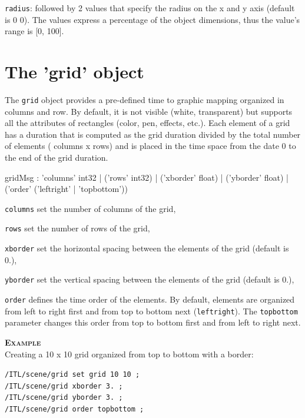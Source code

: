 \documentclass[a4paper,twoside]{report}
\newcommand{\sublevel}[1]	{\section{#1}}
\newcommand{\OSC}[1]		{\texttt{#1}}
\newcommand{\example}		{\textbf{\hspace{-1.5cm}\textbf{\textsc{Example }}}}
\let\olditemize\itemize
\let\oldenditemize\enditemize
\renewenvironment{itemize} 	{\olditemize \setlength{\itemsep}{1mm}}{\oldenditemize}
\newcommand{\sample}	[1]			{\vspace{-2mm}\begin{center}\colorbox{mygrey}{
								\begin{minipage}[t]{0.9\columnwidth} 
								{\small \texttt{#1}}
								\end{minipage}}\end{center}}
\begin{document}
\begin{itemize}
\item \OSC{radius}: followed by 2 values that specify the radius on the x and y axis (default is 0 0). The values express a percentage of the object dimensions, thus the value's range is [0, 100].
\end{itemize} 


\sublevel{The 'grid' object}
\label{grid}

The \OSC{grid} object provides a pre-defined time to graphic mapping organized in columns and row. By default, it is not visible (white, transparent) but supports all the attributes of rectangles (color, pen, effects, etc.). Each element of a grid has a duration that is computed as the grid duration divided by the total number of elements ( columns x rows) and is placed in the time space from the date 0 to the end of the grid duration.

\begin{rail}
gridMsg : 'columns' int32
		| ('rows' int32) 
		| ('xborder' float)
		| ('yborder' float)
		| ('order' ('leftright' | 'topbottom'))
\end{rail}

\begin{itemize}
\item \OSC{columns} set the number of columns of the grid,
\item \OSC{rows} set the number of rows of the grid,
\item \OSC{xborder} set the horizontal spacing between the elements of the grid (default is 0.),
\item \OSC{yborder} set the vertical spacing between the elements of the grid (default is 0.),
\item \OSC{order} defines the time order of the elements. By default, elements are organized from left to right first and from top to bottom next (\OSC{leftright}). The \OSC{topbottom} parameter changes this order from top to bottom first and from left to right next.
\end{itemize}

\example \\
Creating a 10 x 10 grid organized from top to bottom with a border:
\sample{/ITL/scene/grid set grid 10 10 ;\\
/ITL/scene/grid xborder 3. ;\\
/ITL/scene/grid yborder 3. ;\\
/ITL/scene/grid order topbottom ;
}
\end{document}
